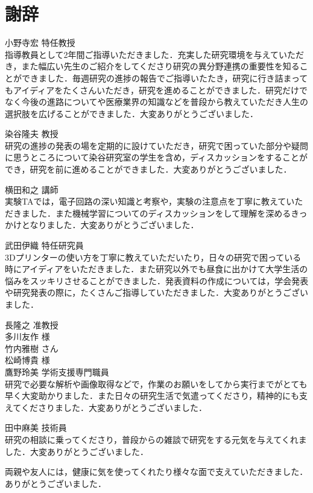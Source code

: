 \chapter*{謝辞}%
%

小野寺宏 特任教授\\
指導教員として2年間ご指導いただきました．充実した研究環境を与えていただき，また幅広い先生のご紹介をしてくださり研究の異分野連携の重要性を知ることができました．毎週研究の進捗の報告でご指導いたたき，研究に行き詰まってもアイディアをたくさんいただき，研究を進めることができました．研究だけでなく今後の進路についてや医療業界の知識などを普段から教えていただき人生の選択肢を広げることができました．大変ありがとうございました．

染谷隆夫 教授\\
研究の進捗の発表の場を定期的に設けていただき，研究で困っていた部分や疑問に思うところについて染谷研究室の学生を含め，ディスカッションをすることができ，研究を前に進めることができました．大変ありがとうございました．

横田和之 講師\\
実験TAでは，電子回路の深い知識と考察や，実験の注意点を丁寧に教えていただきました．また機械学習についてのディスカッションをして理解を深めるきっかけとなりました．大変ありがとうございました．

武田伊織 特任研究員\\
3Dプリンターの使い方を丁寧に教えていただいたり，日々の研究で困っている時にアイディアをいただきました．また研究以外でも昼食に出かけて大学生活の悩みをスッキリさせることができました．発表資料の作成については，学会発表や研究発表の際に，たくさんご指導していただきました．大変ありがとうございました．

長隆之 准教授\\

多川友作 様\\

竹内雅樹 さん\\

松崎博貴 様\\


鷹野玲美 学術支援専門職員\\
研究で必要な解析や画像取得などで，作業のお願いをしてから実行までがとても早く大変助かりました．また日々の研究生活で気遣ってくださり，精神的にも支えてくださりました．大変ありがとうございました．

田中麻美 技術員\\
研究の相談に乗ってくださり，普段からの雑談で研究をする元気を与えてくれました．大変ありがとうございました．

両親や友人には，健康に気を使ってくれたり様々な面で支えていただきました．ありがとうございました．
